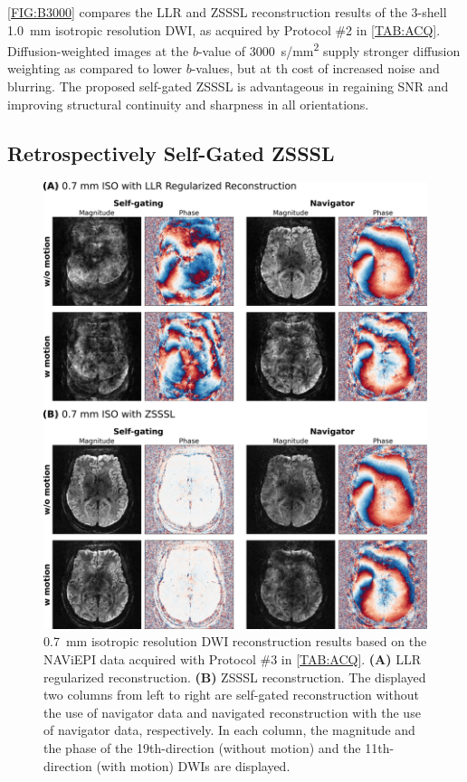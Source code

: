 \documentclass[journal,twoside,web]{ieeecolor}
\begin{document}
	\cref{FIG:B3000} compares the LLR and ZSSSL reconstruction results 
	of the 3-shell \SI{1.0}{mm} isotropic resolution DWI, 
	as acquired by Protocol \#2 in \cref{TAB:ACQ}. 
	Diffusion-weighted images at the $b$-value of \SI{3000}{s/mm^2} supply
	stronger diffusion weighting as compared to lower $b$-values, 
	but at th cost of increased noise and blurring. 
	The proposed self-gated ZSSSL is advantageous in 
	regaining SNR and improving structural continuity and sharpness in all orientations.
	


	\subsection{Retrospectively Self-Gated ZSSSL}

	\begin{figure}
		\centering
		\includegraphics[width=\textwidth]{../figures/fig4.png}
		\caption{\SI{0.7}{\milli\meter} isotropic resolution DWI reconstruction results
			based on the NAViEPI data acquired with Protocol \#3 in \cref{TAB:ACQ}.
			\textbf{(A)} LLR regularized reconstruction.
			\textbf{(B)} ZSSSL reconstruction.
			The displayed two columns from left to right are
			self-gated reconstruction without the use of navigator data and
			navigated reconstruction with the use of navigator data, respectively.
			In each column, the magnitude and the phase
			of the 19th-direction (without motion) and the 11th-direction (with motion)
			DWIs are displayed.
		}
		\label{FIG:MOTION_RETRO_AXIAL}
	\end{figure}
\end{document}
